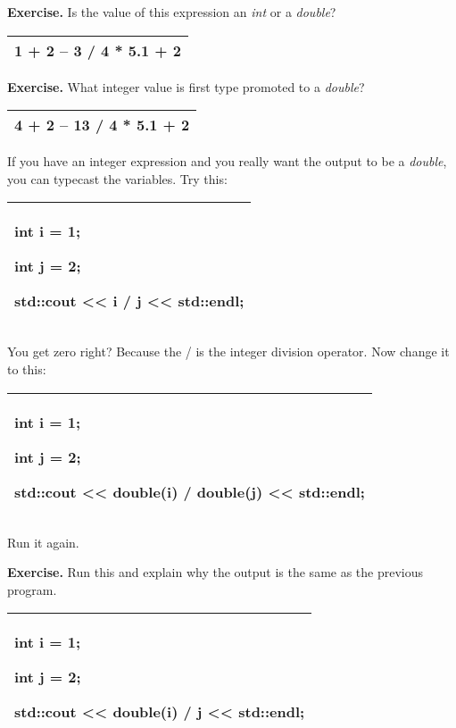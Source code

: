 \documentclass[
]{article}
\begin{document}
\textbf{Exercise.} Is the value of this expression an \emph{int} or a
\emph{double}?

\begin{longtable}[]{@{}l@{}}
\toprule
\endhead
1 + 2 -- 3 / 4 * 5.1 + 2\tabularnewline
\bottomrule
\end{longtable}

\textbf{Exercise.} What integer value is first type promoted to a
\emph{double}?

\begin{longtable}[]{@{}l@{}}
\toprule
\endhead
4 + 2 -- 13 / 4 * 5.1 + 2\tabularnewline
\bottomrule
\end{longtable}

If you have an integer expression and you really want the output to be a
\emph{double}, you can typecast the variables. Try this:

\begin{longtable}[]{@{}l@{}}
\toprule
\endhead
\begin{minipage}[t]{0.97\columnwidth}\raggedright
int i = 1;

int j = 2;

std::cout \textless\textless{} i / j \textless\textless{}
std::endl;\strut
\end{minipage}\tabularnewline
\bottomrule
\end{longtable}

You get zero right? Because the / is the integer division operator. Now
change it to this:

\begin{longtable}[]{@{}l@{}}
\toprule
\endhead
\begin{minipage}[t]{0.97\columnwidth}\raggedright
int i = 1;

int j = 2;

std::cout \textless\textless{} double(i) / double(j)
\textless\textless{} std::endl;\strut
\end{minipage}\tabularnewline
\bottomrule
\end{longtable}

Run it again.

\textbf{Exercise.} Run this and explain why the output is the same as
the previous program.

\begin{longtable}[]{@{}l@{}}
\toprule
\endhead
\begin{minipage}[t]{0.97\columnwidth}\raggedright
int i = 1;

int j = 2;

std::cout \textless\textless{} double(i) / j \textless\textless{}
std::endl;\strut
\end{minipage}\tabularnewline
\bottomrule
\end{longtable}
\end{document}
